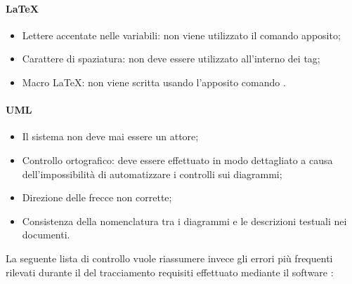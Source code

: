 \documentclass[12pt,a4paper]{article}
\begin{document}
\paragraph{LaTeX}
\begin{itemize}
	\item Lettere accentate nelle variabili: non viene utilizzato il comando apposito; 
	\item Carattere di spaziatura: non deve essere utilizzato all'interno dei tag; 
	\item Macro \LaTeX{}: non viene scritta usando l’apposito comando . 
\end{itemize}


\paragraph{UML}
\begin{itemize}
	\item Il sistema non deve mai essere un attore; 
	\item Controllo ortografico: deve essere effettuato in modo dettagliato a causa dell'impossibilità di automatizzare i controlli sui diagrammi; 
	\item Direzione delle frecce non corrette; 
	\item Consistenza della nomenclatura tra i diagrammi e le descrizioni testuali nei documenti. 
\end{itemize}

La seguente lista di controllo vuole riassumere invece gli  errori più frequenti rilevati durante il  del tracciamento requisiti effettuato mediante il software :
\end{document}
